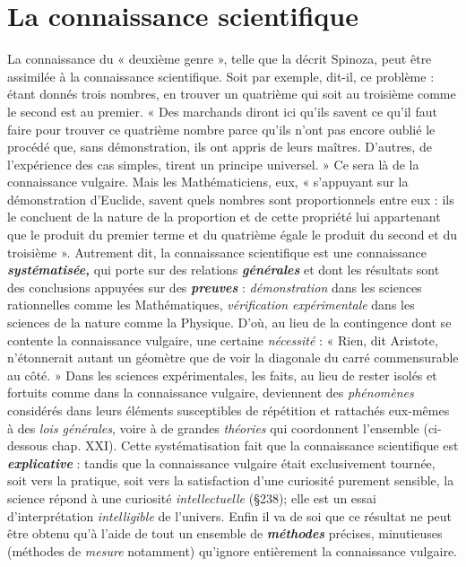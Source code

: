 \section{La connaissance scientifique}%
La connaissance du
« deuxième genre », telle que la décrit Spinoza, peut être assimilée
à la connaissance scientifique. Soit par exemple, dit-il, ce problème :
étant donnés trois nombres, en trouver un quatrième qui soit au troisième
comme le second est au premier. « Des marchands diront ici
qu’ils savent ce qu’il faut faire pour trouver ce quatrième nombre
parce qu’ils n’ont pas encore oublié le procédé que, sans démonstration,
ils ont appris de leurs maîtres. D’autres, de l’expérience des cas
simples, tirent un principe universel. » Ce sera là de la connaissance
vulgaire. Mais les Mathématiciens, eux, « s'appuyant sur la démonstration
d’Euclide, savent quels nombres sont proportionnels entre eux :
ils le concluent de la nature de la proportion et de cette propriété lui
appartenant que le produit du premier terme et du quatrième égale
le produit du second et du troisième ». Autrement dit, la connaissance
scientifique est une connaissance \textbf{\textit {systématisée,}} qui porte sur des
relations \textbf{\textit {générales}} et dont les résultats sont des conclusions appuyées
sur des \textbf{\textit {preuves}} : {\it démonstration} dans les sciences rationnelles comme
les Mathématiques, {\it vérification expérimentale} dans les sciences de
la nature comme la Physique. D’où, au lieu de la contingence dont se
contente la connaissance vulgaire, une certaine {\it nécessité} : « Rien,
dit Aristote, n’étonnerait autant un géomètre que de voir la diagonale
du carré commensurable au côté. » Dans les sciences expérimentales,
les faits, au lieu de rester isolés et fortuits comme dans la connaissance
vulgaire, deviennent des {\it phénomènes} considérés dans leurs
éléments susceptibles de répétition et rattachés eux-mêmes à des {\it lois
générales}, voire à de grandes {\it théories} qui coordonnent l’ensemble
(ci-dessous chap. XXI). Cette systématisation fait que la connaissance
scientifique est \textbf{\textit {explicative}} : tandis que la connaissance vulgaire était
exclusivement tournée, soit vers la pratique, soit vers la satisfaction
d’une curiosité purement sensible, la science répond à une curiosité
{\it intellectuelle} (\S 238); elle est un essai d'interprétation {\it intelligible} de
l'univers. Enfin il va de soi que ce résultat ne peut être obtenu qu’à
l’aide de tout un ensemble de \textbf{\textit {méthodes}} précises, minutieuses (méthodes
de {\it mesure} notamment) qu’ignore entièrement la connaissance vulgaire.

